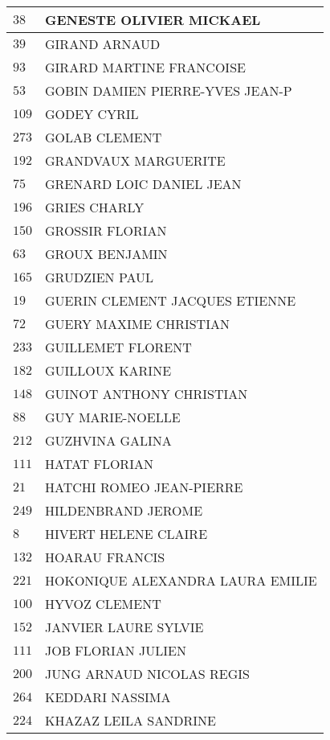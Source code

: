 \begin{xltabular}{\linewidth}{|l|X|}
    \hline
    $38$ & GENESTE OLIVIER MICKAEL \\
    \hline
    $39$ & GIRAND ARNAUD \\
    \hline
    $93$ & GIRARD MARTINE FRANCOISE \\
    \hline
    $53$ & GOBIN DAMIEN PIERRE-YVES JEAN-P \\
    \hline
    $109$ & GODEY CYRIL \\
    \hline
    $273$ & GOLAB CLEMENT \\
    \hline
    $192$ & GRANDVAUX MARGUERITE \\
    \hline
    $75$ & GRENARD LOIC DANIEL JEAN \\
    \hline
    $196$ & GRIES CHARLY \\
    \hline
    $150$ & GROSSIR FLORIAN \\
    \hline
    $63$ & GROUX BENJAMIN \\
    \hline
    $165$ & GRUDZIEN PAUL \\
    \hline
    $19$ & GUERIN CLEMENT JACQUES ETIENNE \\
    \hline
    $72$ & GUERY MAXIME CHRISTIAN \\
    \hline
    $233$ & GUILLEMET FLORENT \\
    \hline
    $182$ & GUILLOUX KARINE \\
    \hline
    $148$ & GUINOT ANTHONY CHRISTIAN \\
    \hline
    $88$ & GUY MARIE-NOELLE \\
    \hline
    $212$ & GUZHVINA GALINA \\
    \hline
    $111$ & HATAT FLORIAN \\
    \hline
    $21$ & HATCHI ROMEO JEAN-PIERRE \\
    \hline
    $249$ & HILDENBRAND JEROME \\
    \hline
    $8$ & HIVERT HELENE CLAIRE \\
    \hline
    $132$ & HOARAU FRANCIS \\
    \hline
    $221$ & HOKONIQUE ALEXANDRA LAURA EMILIE \\
    \hline
    $100$ & HYVOZ CLEMENT \\
    \hline
    $152$ & JANVIER LAURE SYLVIE \\
    \hline
    $111$ & JOB FLORIAN JULIEN \\
    \hline
    $200$ & JUNG ARNAUD NICOLAS REGIS \\
    \hline
    $264$ & KEDDARI NASSIMA \\
    \hline
    $224$ & KHAZAZ LEILA SANDRINE \\

\end{xltabular}
